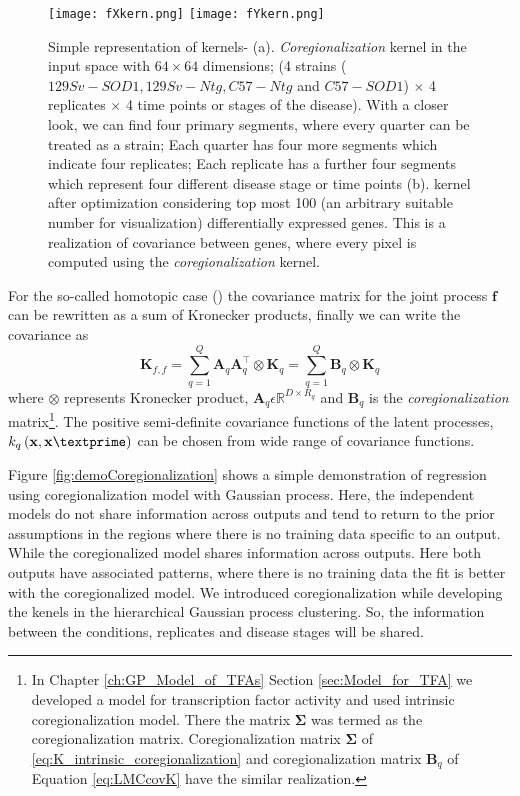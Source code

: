 \begin{figure}
 \begin{center}
  \texttt{[image: fXkern.png]}
  \texttt{[image: fYkern.png]}
  \caption {Simple representation of kernels- (a). \emph{Coregionalization} kernel in the input space  with $64\times64$ dimensions; (4 strains ($129Sv-SOD1, 129Sv-Ntg, C57-Ntg$ and $C57-SOD1$) $\times$ 4 replicates $\times$ 4 time points or stages of the disease). With a closer look, we can find four primary segments, where every quarter can be treated as a strain; Each quarter has four more segments which indicate four replicates; Each replicate has a further four segments which represent four different disease stage or time points (b). kernel after optimization considering top most 100 (an arbitrary suitable number for visualization) differentially expressed genes. This is a realization of covariance between genes, where every pixel is computed using the \emph{coregionalization} kernel.
  \label{fig:kernel}}
 \end{center}
\end{figure}

For the so-called homotopic case (\cite{Alvarez:2011, Wackernagel:2003}) the covariance matrix for the joint process $\textbf{f}$ can be rewritten as a sum of Kronecker products, finally we can write the covariance as
\begin{equation} \label{eq:LMCcovK}
\textbf{K}_{f,f}=\sum\limits_{q=1}^Q \textbf{A}_q\textbf{A}^{\top}_q \otimes \textbf{K}_q
=\sum\limits_{q=1}^Q \textbf{B}_q \otimes \textbf{K}_q
\end{equation}
where $\otimes$ represents Kronecker product, $\textbf{A}_q \epsilon \mathbb{R}^{D\times R_q}$ and $\textbf{B}_q$ is the \emph{coregionalization} matrix\footnote{In Chapter \ref{ch:GP_Model_of_TFAs} Section \ref{sec:Model_for_TFA} we developed a model for transcription factor activity and used intrinsic coregionalization model. There the matrix $\boldsymbol{\Sigma}$ was termed as the coregionalization matrix. Coregionalization matrix $\boldsymbol{\Sigma}$ of \ref{eq:K_intrinsic_coregionalization} and coregionalization matrix $\textbf{B}_q$ of Equation \ref{eq:LMCcovK} have the similar realization.}. The positive semi-definite covariance functions of the latent processes, $k_q\left(\textbf{x},\textbf{x}\textprime\right)$ can be chosen from wide range of covariance functions. 

Figure \ref{fig:demoCoregionalization} shows a simple demonstration of regression using coregionalization model with Gaussian process. Here, the independent models do not share information across outputs and tend to return to the prior assumptions in the regions where there is no training data specific to an output. While the coregionalized model shares information across outputs. Here both outputs have associated patterns, where there is no training data the fit is better with the coregionalized model. We introduced coregionalization while developing the kenels in the hierarchical Gaussian process clustering. So, the information between the conditions, replicates and disease stages will be shared. 


